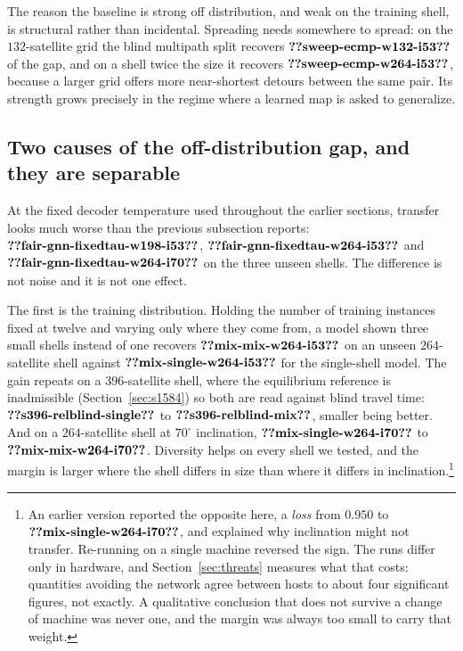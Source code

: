 \documentclass[journal]{IEEEtran}
\begin{document}
The reason the baseline is strong off distribution, and weak on the training shell, is structural
rather than incidental. Spreading needs somewhere to spread: on the $132$-satellite grid the
blind multipath split recovers $\clm{sweep-ecmp-w132-i53}$ of the gap, and on a shell twice the size it recovers
$\clm{sweep-ecmp-w264-i53}$, because a larger grid offers more near-shortest detours between the same pair. Its
strength grows precisely in the regime where a learned map is asked to generalize.

\subsection{Two causes of the off-distribution gap, and they are separable}\label{sec:two-causes}

At the fixed decoder temperature used throughout the earlier sections, transfer looks much worse
than the previous subsection reports: $\clm{fair-gnn-fixedtau-w198-i53}$, $\clm{fair-gnn-fixedtau-w264-i53}$ and $\clm{fair-gnn-fixedtau-w264-i70}$ on the three unseen shells.
The difference is not noise and it is not one effect.

The first is the training distribution. Holding the number of training instances fixed at twelve and varying only where they come from, a model shown three small shells instead of one recovers $\clm{mix-mix-w264-i53}$ on an unseen $264$-satellite shell against $\clm{mix-single-w264-i53}$ for the single-shell model. The gain repeats on a $396$-satellite shell, where the equilibrium reference is
inadmissible (Section~\ref{sec:s1584}) so both are read against blind travel time:
$\clm{s396-relblind-single}$ to $\clm{s396-relblind-mix}$, smaller being better. And on a $264$-satellite shell at $70^\circ$ inclination, $\clm{mix-single-w264-i70}$ to $\clm{mix-mix-w264-i70}$. Diversity helps on every shell we tested, and the margin is larger where the shell differs in size than where it differs in inclination.\footnote{An earlier version reported the opposite here, a \emph{loss} from $0.950$ to
$\clm{mix-single-w264-i70}$, and explained why inclination might not transfer. Re-running on a single machine reversed
the sign. The runs differ only in hardware, and Section~\ref{sec:threats} measures what
that costs: quantities avoiding the network agree between hosts to about four significant
figures, not exactly. A qualitative conclusion that does not survive a change of machine was never one,
and the margin was always too small to carry that weight.}
\end{document}
